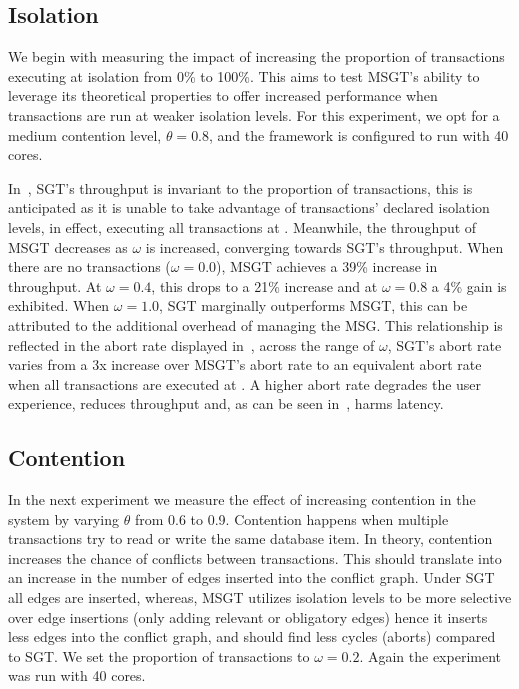 \subsection{Isolation}
\label{sec:isolation}



We begin with measuring the impact of increasing the proportion of transactions executing at  
isolation from 0\% to 100\%. This aims to test MSGT's ability to leverage its theoretical properties to offer increased 
performance when transactions are run at weaker isolation levels. For this experiment, we opt for a medium contention 
level, $\theta=0.8$, and the framework is configured to run with 40 cores.

In~, SGT's throughput is invariant 
to the proportion of  transactions, 
this is anticipated as it is unable to take advantage of 
transactions' declared isolation levels, in effect, 
executing all transactions at . 
Meanwhile, the throughput of MSGT decreases as $\omega$ 
is increased, converging towards SGT's throughput. When 
there are no  transactions 
($\omega = 0.0$), MSGT achieves a 39\% increase in 
throughput. At $\omega = 0.4$, this drops to a 21\%
increase and at $\omega = 0.8$ a 4\% gain is exhibited. 
When $\omega = 1.0$, SGT marginally outperforms MSGT, 
this can be attributed to the additional overhead of 
managing the MSG. This relationship is reflected in the
abort rate displayed in~, across 
the range of $\omega$, SGT's abort rate varies from a 3x 
increase over MSGT's abort rate to an equivalent abort 
rate when all transactions are executed at 
. A higher abort rate degrades the 
user experience, reduces throughput and, as can be seen
in~, harms latency.



\subsection{Contention}
\label{sec:contention}

In the next experiment we measure the effect of increasing contention in the system by varying $\theta$ from 
0.6 to 0.9. Contention happens when multiple transactions try to read or write the same database item. In 
theory, contention increases the chance of conflicts between transactions. This should translate into an 
increase in the number of edges inserted into the conflict graph. Under SGT all edges are inserted, whereas, 
MSGT utilizes isolation levels to be more selective over edge insertions (only adding relevant or obligatory 
edges) hence it inserts less edges into the conflict graph, and should find less cycles (aborts) compared to SGT. We 
set the proportion of  transactions to $\omega=0.2$. Again the experiment was run with 40 cores.

